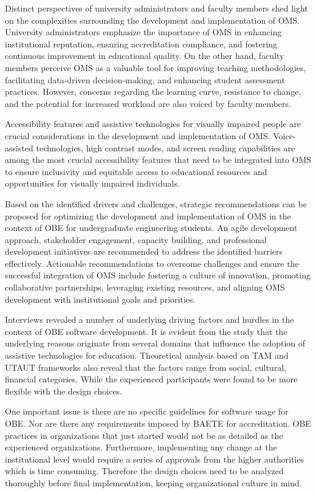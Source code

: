\documentclass[journal,onecolumn]{IEEEtran}
\begin{document}
\begin{itemize}
Distinct perspectives of university administrators and faculty members shed light on the complexities surrounding the development and implementation of OMS. University administrators emphasize the importance of OMS in enhancing institutional reputation, ensuring accreditation compliance, and fostering continuous improvement in educational quality. On the other hand, faculty members perceive OMS as a valuable tool for improving teaching methodologies, facilitating data-driven decision-making, and enhancing student assessment practices. However, concerns regarding the learning curve, resistance to change, and the potential for increased workload are also voiced by faculty members.

Accessibility features and assistive technologies for visually impaired people are crucial considerations in the development and implementation of OMS. Voice-assisted technologies, high contrast modes, and screen reading capabilities are among the most crucial accessibility features that need to be integrated into OMS to ensure inclusivity and equitable access to educational resources and opportunities for visually impaired individuals.

Based on the identified drivers and challenges, strategic recommendations can be proposed for optimizing the development and implementation of OMS in the context of OBE for undergraduate engineering students. An agile development approach, stakeholder engagement, capacity building, and professional development initiatives are recommended to address the identified barriers effectively. Actionable recommendations to overcome challenges and ensure the successful integration of OMS include fostering a culture of innovation, promoting collaborative partnerships, leveraging existing resources, and aligning OMS development with institutional goals and priorities.

Interviews revealed a number of underlying driving factors and hurdles in the context of OBE software development. It is evident from the study that the underlying reasons originate from several domains that influence the adoption of assistive technologies for education. Theoretical analysis based on TAM and UTAUT frameworks also reveal that the factors range from social, cultural, financial categories. While the experienced participants were found to be more flexible with the design choices.

One important issue is there are no specific guidelines for software usage for OBE. Nor are there any requirements imposed by BAETE for accreditation. OBE practices in organizations that just started would not be as detailed as the experienced organizations. Furthermore, implementing any change at the institutional level would require a series of approvals from the higher authorities which is time consuming. Therefore the design choices need to be analyzed thoroughly before final implementation, keeping organizational culture in mind. 


\end{itemize}
\end{document}
